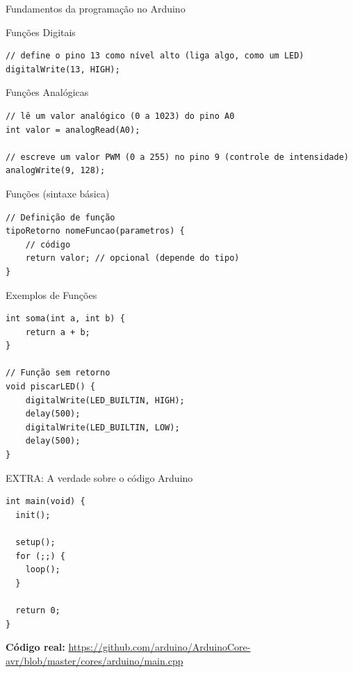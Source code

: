 \begin{frame}{Fundamentos da programação no Arduino}
\begin{block}{Funções Digitais}
\begin{verbatim}
// define o pino 13 como nível alto (liga algo, como um LED)
digitalWrite(13, HIGH);
    \end{verbatim}
  \end{block}

  \begin{block}{Funções Analógicas}
    \begin{verbatim}
// lê um valor analógico (0 a 1023) do pino A0
int valor = analogRead(A0);

// escreve um valor PWM (0 a 255) no pino 9 (controle de intensidade)
analogWrite(9, 128);
    \end{verbatim}
  \end{block}

  \begin{block}{Funções (sintaxe básica)}
    \begin{verbatim}
// Definição de função
tipoRetorno nomeFuncao(parametros) {
    // código
    return valor; // opcional (depende do tipo)
}
    \end{verbatim}
  \end{block}

  \begin{block}{Exemplos de Funções}
    \begin{verbatim}
int soma(int a, int b) {
    return a + b;
}

// Função sem retorno
void piscarLED() {
    digitalWrite(LED_BUILTIN, HIGH);
    delay(500);
    digitalWrite(LED_BUILTIN, LOW);
    delay(500);
}
    \end{verbatim}
  \end{block}
\end{frame}

\begin{frame}[fragile]{EXTRA: A verdade sobre o código Arduino}
  \begin{block}{}
    \begin{verbatim}
int main(void) {
  init();

  setup();
  for (;;) {
    loop();
  }

  return 0;
}
    \end{verbatim}
  \end{block}
  \vspace{0.3cm}
  \textbf{Código real:} \url{https://github.com/arduino/ArduinoCore-avr/blob/master/cores/arduino/main.cpp}
\end{frame}

